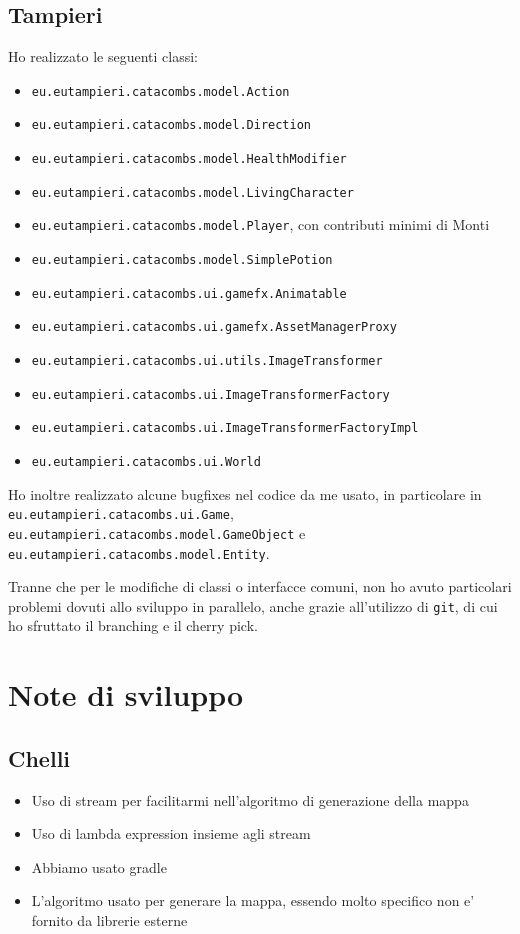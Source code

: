 \documentclass[a4paper,12pt]{report}
\begin{document}
    \subsection{Tampieri}
    \par Ho realizzato le seguenti classi:
    \begin{itemize}
        \item \texttt{eu.eutampieri.catacombs.model.Action}
        \item \texttt{eu.eutampieri.catacombs.model.Direction}
        \item \texttt{eu.eutampieri.catacombs.model.HealthModifier}
        \item \texttt{eu.eutampieri.catacombs.model.LivingCharacter}
        \item \texttt{eu.eutampieri.catacombs.model.Player}, con contributi minimi di Monti
        \item \texttt{eu.eutampieri.catacombs.model.SimplePotion}
        \item \texttt{eu.eutampieri.catacombs.ui.gamefx.Animatable}
        \item \texttt{eu.eutampieri.catacombs.ui.gamefx.AssetManagerProxy}
        \item \texttt{eu.eutampieri.catacombs.ui.utils.ImageTransformer}
        \item \texttt{eu.eutampieri.catacombs.ui.ImageTransformerFactory}
        \item \texttt{eu.eutampieri.catacombs.ui.ImageTransformerFactoryImpl}
        \item \texttt{eu.eutampieri.catacombs.ui.World}
    \end{itemize}
    \par Ho inoltre realizzato alcune bugfixes nel codice da me usato, in particolare in \texttt{eu.eutampieri.catacombs.ui.Game}, \texttt{eu.eutampieri.catacombs.model.GameObject} e \texttt{eu.eutampieri.catacombs.model.Entity}.
    \par Tranne che per le modifiche di classi o interfacce comuni, non ho avuto particolari problemi dovuti allo sviluppo in parallelo,
    anche grazie all'utilizzo di \texttt{git}, di cui ho sfruttato il branching e il cherry pick.
    \section{Note di sviluppo}
    \subsection{Chelli}
    \begin{itemize}
        \item Uso di stream per facilitarmi nell'algoritmo di generazione della mappa
        \item Uso di lambda expression insieme agli stream
        \item Abbiamo usato gradle
        \item L'algoritmo usato per generare la mappa, essendo molto specifico non e' fornito da librerie esterne
    \end{itemize}
\end{document}
